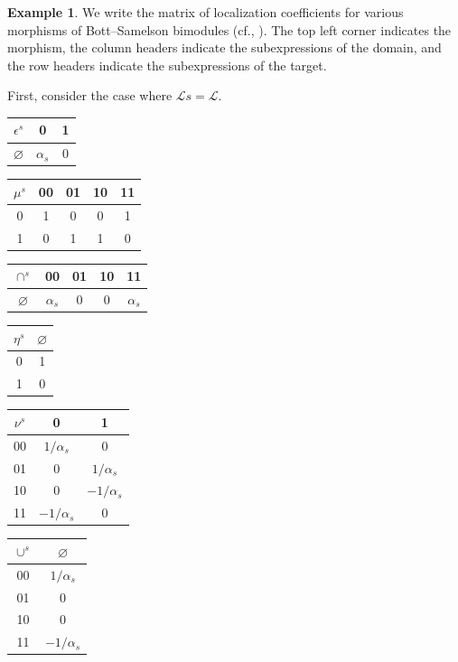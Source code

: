 \documentclass{amsart}
\newcommand{\scrL}{\mathcal{L}}
\renewcommand{\emptyset}{\varnothing}
\theoremstyle{definition}
\newtheorem{example}[subsubsection]{Example}
\numberwithin{equation}{subsection}
\begin{document}
\begin{example}\label{ex:localization_of_one_color_morphisms}
    We write the matrix of localization coefficients for various morphisms of Bott--Samelson bimodules (cf., \cite{EW17}). 
    The top left corner indicates the morphism, the column headers indicate the subexpressions of the domain, and the row headers indicate the subexpressions of the target.

    First, consider the case where $\scrL s = \scrL$.

    \begin{center}
    \begin{tabular}[t]{c | c  c}
        $\epsilon^s$ & 0 & 1 \\
        \hline
        $\emptyset$ & $\alpha_s$ & 0 
    \end{tabular}\qquad\qquad
    \begin{tabular}[t]{c | c c c c}
        $\mu^s$ & 00 & 01 & 10 & 11 \\
        \hline
        0 & 1 & 0 & 0 & 1 \\
        1 & 0 & 1 & 1 & 0
    \end{tabular}\qquad\qquad
    \begin{tabular}[t]{c | c c c c}
        $\cap^s$ & 00 & 01 & 10 & 11 \\
        \hline
        $\emptyset$ & $\alpha_s$ & 0 & 0 & $\alpha_s$ 
    \end{tabular}
\end{center}

\begin{center}
    \begin{tabular}[t]{c | c }
        $\eta^s$ & $\emptyset$ \\
        \hline
        0 & 1 \\
        1 & 0 
    \end{tabular}\qquad\qquad
    \begin{tabular}[t]{c | c c }
        $\nu^s$ & 0 & 1 \\
        \hline
        00 & $1/\alpha_s$ & 0 \\
        01 & 0 & $1/\alpha_s$ \\
        10 & 0 & $-1/\alpha_s$ \\
        11 & $-1/\alpha_s$ & 0 
    \end{tabular}\qquad\qquad
    \begin{tabular}[t]{c | c }
        $\cup^s$ & $\emptyset$ \\
        \hline
        00 & $1/\alpha_s$  \\
        01 & 0  \\
        10 & 0  \\
        11 & $-1/\alpha_s$ 
    \end{tabular}
\end{center}


\end{example}
\end{document}
